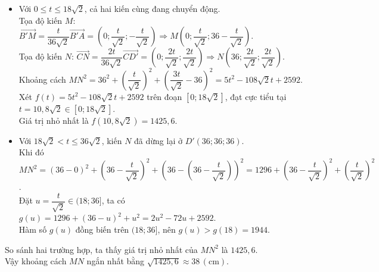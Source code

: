 \begin{ex}
{{
		}
		\begin{itemize}
			\item Với $0 \leq t \leq 18\sqrt{2}$, cả hai kiến cùng đang chuyển động.\\
			Tọa độ kiến $M$: $\overrightarrow{B'M} = \dfrac{t}{36\sqrt{2}}\overrightarrow{B'A} = \left(0; \dfrac{t}{\sqrt{2}}; -\dfrac{t}{\sqrt{2}}\right) \Rightarrow M\left(0; \dfrac{t}{\sqrt{2}}; 36-\dfrac{t}{\sqrt{2}}\right)$.\\
			Tọa độ kiến $N$: $\overrightarrow{CN} = \dfrac{2t}{36\sqrt{2}}\overrightarrow{CD'} = \left(0; \dfrac{2t}{\sqrt{2}}; \dfrac{2t}{\sqrt{2}}\right) \Rightarrow N\left(36; \dfrac{2t}{\sqrt{2}}; \dfrac{2t}{\sqrt{2}}\right)$.\\
			Khoảng cách $MN^2 = 36^2 + \left(\dfrac{t}{\sqrt{2}}\right)^2 + \left(\dfrac{3t}{\sqrt{2}}-36\right)^2 = 5t^2 - 108\sqrt{2}t + 2592$.\\
			Xét $f(t) = 5t^2 - 108\sqrt{2}t + 2592$ trên đoạn $\left[0; 18\sqrt{2}\right]$, đạt cực tiểu tại $t = 10{,}8\sqrt{2} \in \left[0; 18\sqrt{2}\right]$.\\
			Giá trị nhỏ nhất là $f(10{,}8\sqrt{2}) = 1425{,}6$.
			\item Với $18\sqrt{2} < t \le 36\sqrt{2}$, kiến $N$ đã dừng lại ở $D'(36; 36; 36)$.\\
			Khi đó $MN^2 = (36-0)^2 + \left(36-\dfrac{t}{\sqrt{2}}\right)^2 + \left(36 - \left(36-\dfrac{t}{\sqrt{2}}\right)\right)^2 = 1296 + \left(36-\dfrac{t}{\sqrt{2}}\right)^2 + \left(\dfrac{t}{\sqrt{2}}\right)^2$.\\
			Đặt $u = \dfrac{t}{\sqrt{2}} \in (18; 36]$, ta có $g(u) = 1296 + (36-u)^2 + u^2 = 2u^2 - 72u + 2592$.\\
			Hàm số $g(u)$ đồng biến trên $(18; 36]$, nên $g(u) > g(18) = 1944$.
		\end{itemize}
		So sánh hai trường hợp, ta thấy giá trị nhỏ nhất của $MN^2$ là $1425{,}6$.\\
		Vậy khoảng cách $MN$ ngắn nhất bằng $\sqrt{1425{,}6} \approx 38\mathrm{\,(cm)}$.
	}
\end{ex}

